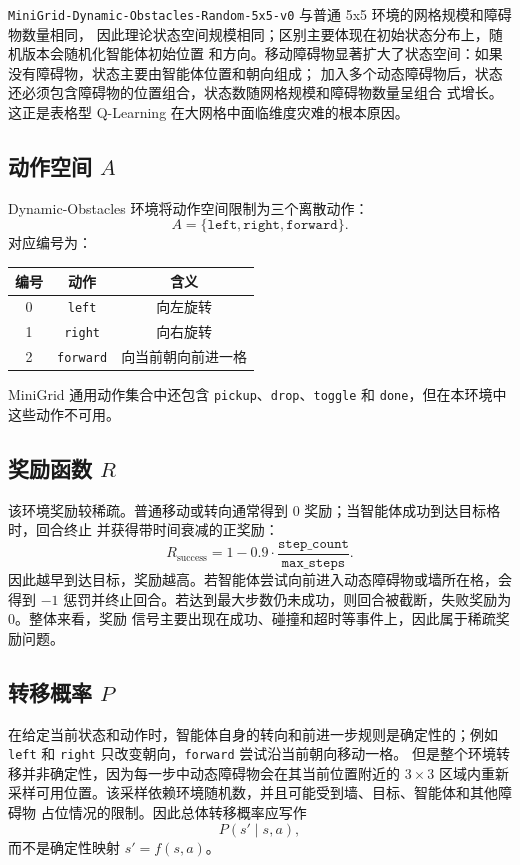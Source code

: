\documentclass[UTF8,a4paper,fontset=fandol]{ctexart}
\begin{document}
\texttt{MiniGrid-Dynamic-Obstacles-Random-5x5-v0} 与普通 5x5 环境的网格规模和障碍物数量相同，
因此理论状态空间规模相同；区别主要体现在初始状态分布上，随机版本会随机化智能体初始位置
和方向。移动障碍物显著扩大了状态空间：如果没有障碍物，状态主要由智能体位置和朝向组成；
加入多个动态障碍物后，状态还必须包含障碍物的位置组合，状态数随网格规模和障碍物数量呈组合
式增长。这正是表格型 Q-Learning 在大网格中面临维度灾难的根本原因。

\subsection{动作空间 \(A\)}

Dynamic-Obstacles 环境将动作空间限制为三个离散动作：
\[
    A = \{\texttt{left}, \texttt{right}, \texttt{forward}\}.
\]
对应编号为：
\begin{center}
\begin{tabular}{c|c|c}
编号 & 动作 & 含义 \\
\hline
0 & \texttt{left} & 向左旋转 \\
1 & \texttt{right} & 向右旋转 \\
2 & \texttt{forward} & 向当前朝向前进一格 \\
\end{tabular}
\end{center}

MiniGrid 通用动作集合中还包含 \texttt{pickup}、\texttt{drop}、\texttt{toggle} 和
\texttt{done}，但在本环境中这些动作不可用。

\subsection{奖励函数 \(R\)}

该环境奖励较稀疏。普通移动或转向通常得到 \(0\) 奖励；当智能体成功到达目标格时，回合终止
并获得带时间衰减的正奖励：
\[
    R_{\text{success}} = 1 - 0.9 \cdot \frac{\texttt{step\_count}}{\texttt{max\_steps}}.
\]
因此越早到达目标，奖励越高。若智能体尝试向前进入动态障碍物或墙所在格，会得到 \(-1\)
惩罚并终止回合。若达到最大步数仍未成功，则回合被截断，失败奖励为 \(0\)。整体来看，奖励
信号主要出现在成功、碰撞和超时等事件上，因此属于稀疏奖励问题。

\subsection{转移概率 \(P\)}

在给定当前状态和动作时，智能体自身的转向和前进一步规则是确定性的；例如
\texttt{left} 和 \texttt{right} 只改变朝向，\texttt{forward} 尝试沿当前朝向移动一格。
但是整个环境转移并非确定性，因为每一步中动态障碍物会在其当前位置附近的 \(3 \times 3\)
区域内重新采样可用位置。该采样依赖环境随机数，并且可能受到墙、目标、智能体和其他障碍物
占位情况的限制。因此总体转移概率应写作
\[
    P(s' \mid s, a),
\]
而不是确定性映射 \(s' = f(s,a)\)。
\end{document}
